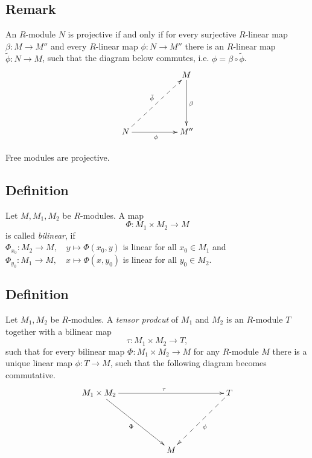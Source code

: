 \documentclass[12pt]{book}
\begin{document}
\begin{spacing}{1.3}
\subsection{Remark}%
\begin{compactenum}
\item An $R$-module $N$ is projective if and only if for every surjective $R$-linear map $\beta:M \longrightarrow M''$ and every $R$-linear map $\phi:N \longrightarrow M''$ there is an $R$-linear map $\tilde{\phi}:N \longrightarrow M$, such that the diagram below commutes, i.e. $\phi=\beta \circ \tilde{\phi}$.
$$\begin{xy}
\xymatrix{
&& M \ar[dd]^{\beta} \\ &&\\ N \ar@{-->}[rruu]^{\tilde{\phi}} \ar[rr]_{\phi} && M''  
}
\end{xy}$$
\item Free modules are projective.
\end{compactenum}

\subsection{Definition}%
Let $M, M_1, M_2$ be $R$-modules. A map
$$\Phi: M_1 \times M_2 \longrightarrow M$$
is called \textit{bilinear}, if\\
$\Phi_{x_0}: M_2 \longrightarrow M, \quad y \mapsto \Phi(x_0,y)$ is linear for all $x_0 \in M_1$ and\\
$\Phi_{y_0}: M_1 \longrightarrow M, \quad x \mapsto \Phi(x,y_0)$ is linear for all $y_0 \in M_2$.

\subsection{Definition}%
Let $M_1, M_2$ be $R$-modules. A \textit{tensor prodcut} of $M_1$ and $M_2$ is an $R$-module $T$ together with a bilinear map
$$\tau: M_1 \times M_2 \longrightarrow T,$$
such that for every bilinear map $\Phi: M_1 \times M_2 \longrightarrow M$ for any $R$-module $M$ there is a unique linear map $\phi:T \longrightarrow M$, such that the following diagram becomes commutative.
$$\begin{xy}
\xymatrix{
M_1 \times M_2 \ar[rrrr]^{\tau} \ar[rrdd]_{\Phi} &&&& T \ar@{-->}[lldd]^{\phi} \\ &&&&\\ && M &&
}
\end{xy}$$


\end{spacing}
\end{document}
